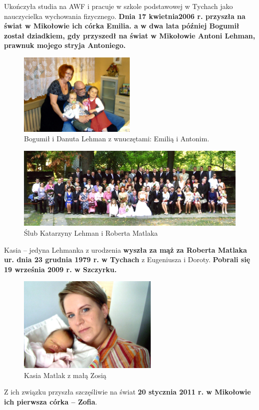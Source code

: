 Ukończyła studia na AWF i pracuje w szkole podstawowej w Tychach jako nauczycielka wychowania fizycznego. \textbf{Dnia 17 kwietnia2006 r. przyszła na świat w Mikołowie ich córka Emilia. a w dwa lata później Bogumił został dziadkiem, gdy przyszedł na świat w Mikołowie Antoni Lehman, prawnuk mojego stryja Antoniego.}

\begin{figure}[!h]
\begin{center}
\includegraphics[width=0.5\textwidth]{photo/bogumil_danuta_lehman_z_wnukami.jpg}
\caption{Bogumił i Danuta Lehman z wnuczętami: Emilią i Antonim.}
\end{center}
\end{figure}

\begin{figure}[!h]
\begin{center}
\includegraphics[width=\textwidth]{photo/katarzyna_robert_matlak_slub_2.jpg}
\caption{Ślub Katarzyny Lehman i Roberta Matlaka}
\end{center}
\end{figure}

Kasia -- jedyna Lehmanka z urodzenia \textbf{wyszła za mąż za Roberta Matlaka ur. dnia 23 grudnia 1979 r. w Tychach} z Eugeniusza i Doroty. \textbf{Pobrali się 19 września 2009 r. w Szczyrku.}

\begin{figure}[!h]
\begin{center}
\includegraphics[width=0.6\textwidth]{photo/zofia_matlak.jpg}
\caption{Kasia Matlak z małą Zosią}
\end{center}
\end{figure}

Z ich związku przyszła szczęśliwie na świat \textbf{20 stycznia 2011 r. w Mikołowie ich pierwsza córka -- Zofia}.